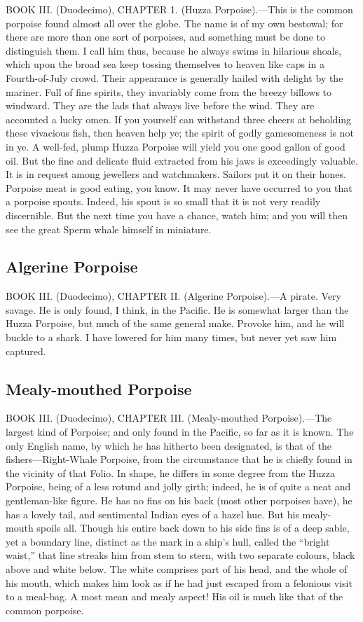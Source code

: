 BOOK III. (Duodecimo), CHAPTER 1. (Huzza Porpoise).—This is the common porpoise found almost all over the globe. The name is of my own bestowal; for there are more than one sort of porpoises, and something must be done to distinguish them. I call him thus, because he always swims in hilarious shoals, which upon the broad sea keep tossing themselves to heaven like caps in a Fourth-of-July crowd. Their appearance is generally hailed with delight by the mariner. Full of fine spirits, they invariably come from the breezy billows to windward. They are the lads that always live before the wind. They are accounted a lucky omen. If you yourself can withstand three cheers at beholding these vivacious fish, then heaven help ye; the spirit of godly gamesomeness is not in ye. A well-fed, plump Huzza Porpoise will yield you one good gallon of good oil. But the fine and delicate fluid extracted from his jaws is exceedingly valuable. It is in request among jewellers and watchmakers. Sailors put it on their hones. Porpoise meat is good eating, you know. It may never have occurred to you that a porpoise spouts. Indeed, his spout is so small that it is not very readily discernible. But the next time you have a chance, watch him; and you will then see the great Sperm whale himself in miniature.

\subsection{Algerine Porpoise}

BOOK III. (Duodecimo), CHAPTER II. (Algerine Porpoise).—A pirate. Very savage. He is only found, I think, in the Pacific. He is somewhat larger than the Huzza Porpoise, but much of the same general make. Provoke him, and he will buckle to a shark. I have lowered for him many times, but never yet saw him captured.

\subsection{Mealy-mouthed Porpoise}

BOOK III. (Duodecimo), CHAPTER III. (Mealy-mouthed Porpoise).—The largest kind of Porpoise; and only found in the Pacific, so far as it is known. The only English name, by which he has hitherto been designated, is that of the fishers—Right-Whale Porpoise, from the circumstance that he is chiefly found in the vicinity of that Folio. In shape, he differs in some degree from the Huzza Porpoise, being of a less rotund and jolly girth; indeed, he is of quite a neat and gentleman-like figure. He has no fins on his back (most other porpoises have), he has a lovely tail, and sentimental Indian eyes of a hazel hue. But his mealy-mouth spoils all. Though his entire back down to his side fins is of a deep sable, yet a boundary line, distinct as the mark in a ship’s hull, called the “bright waist,” that line streaks him from stem to stern, with two separate colours, black above and white below. The white comprises part of his head, and the whole of his mouth, which makes him look as if he had just escaped from a felonious visit to a meal-bag. A most mean and mealy aspect! His oil is much like that of the common porpoise.

